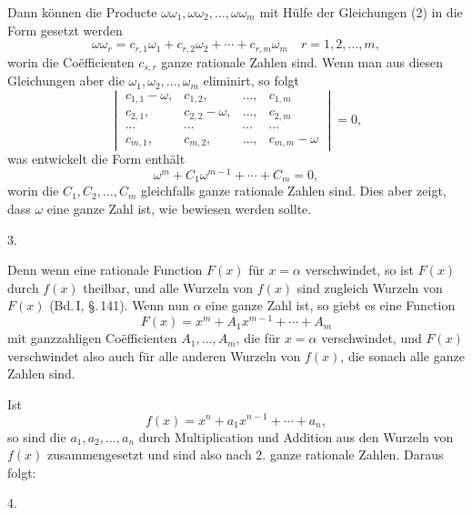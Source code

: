 
Dann k\"onnen die Producte $\omega \omega_1, \omega \omega_2, \ldots, \omega \omega_m$ mit H\"ulfe der Gleichungen (2) in die Form gesetzt werden
\[
\omega \omega_r = c_{r,1} \omega_1 + c_{r,2} \omega_2 + \cdots + c_{r,m} \omega_m \quad r = 1, 2, \ldots, m,
\]
worin die Co\"efficienten $c_{s,r}$ ganze rationale Zahlen sind. Wenn man aus diesen Gleichungen aber die $\omega_1, \omega_2, \ldots, \omega_m$ eliminirt, so folgt
\[
\begin{vmatrix}
c_{1,1} - \omega, & c_{1,2}, & \ldots, & c_{1,m} \\
c_{2,1}, & c_{2,2} - \omega, & \ldots, & c_{2,m} \\
\cdots & \cdots & \cdots & \cdots \\
c_{m,1}, & c_{m,2}, & \ldots, & c_{m,m} - \omega
\end{vmatrix}
= 0,
\]
was entwickelt die Form enth\"alt
\[
\omega^m + C_1 \omega^{m-1} + \cdots + C_m = 0,
\]
worin die $C_1, C_2, \ldots, C_m$ gleichfalls ganze rationale Zahlen sind. Dies aber zeigt, dass $\omega$ eine ganze Zahl ist, wie bewiesen werden sollte.

3. 

Denn wenn eine rationale Function $F(x)$ f\"ur $x = \alpha$ verschwindet, so ist $F(x)$ durch $f(x)$ theilbar, und alle Wurzeln von $f(x)$ sind zugleich Wurzeln von $F(x)$ (Bd.\,I, \S.\,141). Wenn nun $\alpha$ eine ganze Zahl ist, so giebt es eine Function
\[
F(x) = x^m + A_1 x^{m-1} + \cdots + A_m
\]
mit ganzzahligen Co\"efficienten $A_1, \ldots, A_m$, die f\"ur $x = \alpha$ verschwindet, und $F(x)$ verschwindet also auch f\"ur alle anderen Wurzeln von $f(x)$, die sonach alle ganze Zahlen sind.

Ist
\[
f(x) = x^n + a_1 x^{n-1} + \cdots + a_n,
\]
so sind die $a_1, a_2, \ldots, a_n$ durch Multiplication und Addition aus den Wurzeln von $f(x)$ zusammengesetzt und sind also nach 2. ganze rationale Zahlen. Daraus folgt:

4. 
